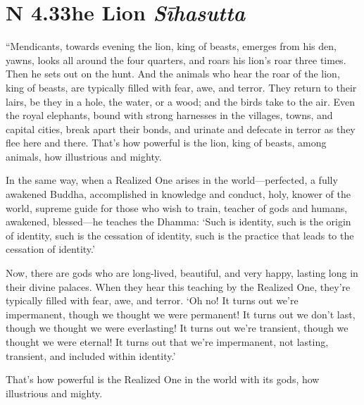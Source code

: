 \documentclass[12pt,openany]{book}%
\newcommand*{\suttatitleacronym}[1]{\smaller[2]{#1}\vspace*{.3em}}
\newcommand*{\suttatitletranslation}[1]{\linebreak{#1}}
\newcommand*{\suttatitleroot}[1]{\linebreak\smaller[2]\itshape{#1}}
\newcommand*{\tocacronym}[1]{\hspace*{-3.3em}{#1}\quad}
\newcommand*{\toctranslation}[1]{#1}
\newcommand*{\tocroot}[1]{(\textit{#1})}
\begin{document}
%
\section*{{\suttatitleacronym AN 4.33}{\suttatitletranslation The Lion }{\suttatitleroot Sīhasutta}}
\addcontentsline{toc}{section}{\tocacronym{AN 4.33} \toctranslation{The Lion } \tocroot{Sīhasutta}}

“Mendicants, towards evening the lion, king of beasts, emerges from his den, yawns, looks all around the four quarters, and roars his lion’s roar three times. Then he sets out on the hunt. And the animals who hear the roar of the lion, king of beasts, are typically filled with fear, awe, and terror. They return to their lairs, be they in a hole, the water, or a wood; and the birds take to the air. Even the royal elephants, bound with strong harnesses in the villages, towns, and capital cities, break apart their bonds, and urinate and defecate in terror as they flee here and there. That’s how powerful is the lion, king of beasts, among animals, how illustrious and mighty. 

In the same way, when a Realized One arises in the world—perfected, a fully awakened Buddha, accomplished in knowledge and conduct, holy, knower of the world, supreme guide for those who wish to train, teacher of gods and humans, awakened, blessed—he teaches the Dhamma: ‘Such is identity, such is the origin of identity, such is the cessation of identity, such is the practice that leads to the cessation of identity.’ 

Now, there are gods who are long-lived, beautiful, and very happy, lasting long in their divine palaces. When they hear this teaching by the Realized One, they’re typically filled with fear, awe, and terror. ‘Oh no! It turns out we’re impermanent, though we thought we were permanent! It turns out we don’t last, though we thought we were everlasting! It turns out we’re transient, though we thought we were eternal! It turns out that we’re impermanent, not lasting, transient, and included within identity.’ 

That’s how powerful is the Realized One in the world with its gods, how illustrious and mighty. 
\end{document}
